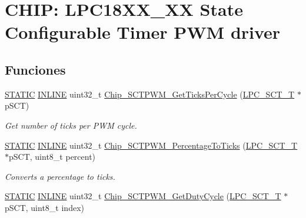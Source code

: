 \hypertarget{group___s_c_t___p_w_m__18_x_x__43_x_x}{}\section{C\+H\+IP\+: L\+P\+C18\+X\+X\+\_\+XX State Configurable Timer P\+WM driver}
\label{group___s_c_t___p_w_m__18_x_x__43_x_x}
\subsection*{Funciones}
\begin{DoxyCompactItemize}
\item 
\hyperlink{group___l_p_c___types___public___macros_ga10b2d890d871e1489bb02b7e70d9bdfb}{S\+T\+A\+T\+IC} \hyperlink{spifi__18xx__43xx_8h_a2eb6f9e0395b47b8d5e3eeae4fe0c116}{I\+N\+L\+I\+NE} uint32\+\_\+t \hyperlink{group___s_c_t___p_w_m__18_x_x__43_x_x_ga6a111f1642326388361bcc2a251a502b}{Chip\+\_\+\+S\+C\+T\+P\+W\+M\+\_\+\+Get\+Ticks\+Per\+Cycle} (\hyperlink{struct_l_p_c___s_c_t___t}{L\+P\+C\+\_\+\+S\+C\+T\+\_\+T} $\ast$p\+S\+CT)
\begin{DoxyCompactList}\small\item\em Get number of ticks per P\+WM cycle. \end{DoxyCompactList}\item 
\hyperlink{group___l_p_c___types___public___macros_ga10b2d890d871e1489bb02b7e70d9bdfb}{S\+T\+A\+T\+IC} \hyperlink{spifi__18xx__43xx_8h_a2eb6f9e0395b47b8d5e3eeae4fe0c116}{I\+N\+L\+I\+NE} uint32\+\_\+t \hyperlink{group___s_c_t___p_w_m__18_x_x__43_x_x_gac04da455f98448bf1d582550935f3b47}{Chip\+\_\+\+S\+C\+T\+P\+W\+M\+\_\+\+Percentage\+To\+Ticks} (\hyperlink{struct_l_p_c___s_c_t___t}{L\+P\+C\+\_\+\+S\+C\+T\+\_\+T} $\ast$p\+S\+CT, uint8\+\_\+t percent)
\begin{DoxyCompactList}\small\item\em Converts a percentage to ticks. \end{DoxyCompactList}\item 
\hyperlink{group___l_p_c___types___public___macros_ga10b2d890d871e1489bb02b7e70d9bdfb}{S\+T\+A\+T\+IC} \hyperlink{spifi__18xx__43xx_8h_a2eb6f9e0395b47b8d5e3eeae4fe0c116}{I\+N\+L\+I\+NE} uint32\+\_\+t \hyperlink{group___s_c_t___p_w_m__18_x_x__43_x_x_ga26e3032074e4a05c9da08309d9614bcd}{Chip\+\_\+\+S\+C\+T\+P\+W\+M\+\_\+\+Get\+Duty\+Cycle} (\hyperlink{struct_l_p_c___s_c_t___t}{L\+P\+C\+\_\+\+S\+C\+T\+\_\+T} $\ast$p\+S\+CT, uint8\+\_\+t index)

\end{DoxyCompactItemize}
